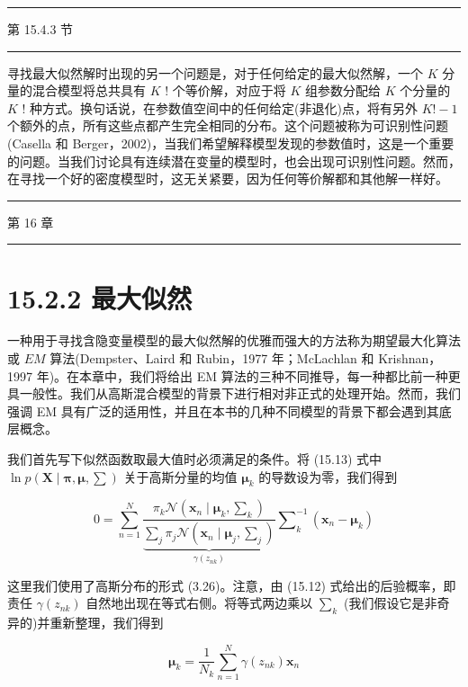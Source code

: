 \documentclass[10pt]{report}
\newcommand{\HRule}{\begin{center}\rule{0.9\linewidth}{0.2mm}\end{center}}
\begin{document}
\HRule

第 15.4.3 节

\HRule

寻找最大似然解时出现的另一个问题是，对于任何给定的最大似然解，一个 \(K\) 分量的混合模型将总共具有 \(K\) ! 个等价解，对应于将 \(K\) 组参数分配给 \(K\) 个分量的 \(K\) ! 种方式。换句话说，在参数值空间中的任何给定(非退化)点，将有另外 \(K! - 1\) 个额外的点，所有这些点都产生完全相同的分布。这个问题被称为可识别性问题(Casella 和 Berger，2002)，当我们希望解释模型发现的参数值时，这是一个重要的问题。当我们讨论具有连续潜在变量的模型时，也会出现可识别性问题。然而，在寻找一个好的密度模型时，这无关紧要，因为任何等价解都和其他解一样好。

\HRule

第 16 章

\HRule

\section*{15.2.2 最大似然}

一种用于寻找含隐变量模型的最大似然解的优雅而强大的方法称为期望最大化算法或 \({EM}\) 算法(Dempster、Laird 和 Rubin，1977 年；McLachlan 和 Krishnan，1997 年)。在本章中，我们将给出 EM 算法的三种不同推导，每一种都比前一种更具一般性。我们从高斯混合模型的背景下进行相对非正式的处理开始。然而，我们强调 EM 具有广泛的适用性，并且在本书的几种不同模型的背景下都会遇到其底层概念。

我们首先写下似然函数取最大值时必须满足的条件。将 (15.13) 式中 \(\ln p\left( {\mathbf{X} \mid  \mathbf{\pi },\mathbf{\mu },\mathbf{\sum }}\right)\) 关于高斯分量的均值 \({\mathbf{\mu }}_{k}\) 的导数设为零，我们得到

\[
0 = \mathop{\sum }\limits_{{n = 1}}^{N}\frac{{\pi }_{k}\mathcal{N}\left( {{\mathbf{x}}_{n} \mid  {\mathbf{\mu }}_{k},{\mathbf{\sum }}_{k}}\right) }{\underset{\gamma \left( {z}_{nk}\right) }{\underbrace{\mathop{\sum }\limits_{j}{\pi }_{j}\mathcal{N}\left( {{\mathbf{x}}_{n} \mid  {\mathbf{\mu }}_{j},{\mathbf{\sum }}_{j}}\right) }}}{\mathbf{\sum }}_{k}^{-1}\left( {{\mathbf{x}}_{n} - {\mathbf{\mu }}_{k}}\right)  \tag{15.15}
\]

这里我们使用了高斯分布的形式 (3.26)。注意，由 (15.12) 式给出的后验概率，即责任 \(\gamma \left( {z}_{nk}\right)\) 自然地出现在等式右侧。将等式两边乘以 \({\mathbf{\sum }}_{k}\) (我们假设它是非奇异的)并重新整理，我们得到

\[
{\mathbf{\mu }}_{k} = \frac{1}{{N}_{k}}\mathop{\sum }\limits_{{n = 1}}^{N}\gamma \left( {z}_{nk}\right) {\mathbf{x}}_{n} \tag{15.16}
\]
\end{document}
